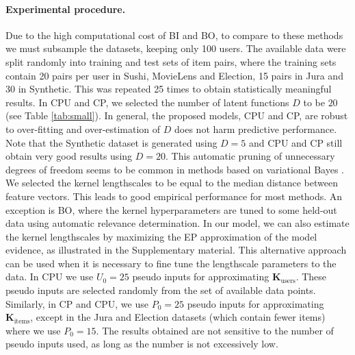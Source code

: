 \paragraph{Experimental procedure.} Due to the high computational cost of BI and BO, to compare to these methods we must subsample the datasets, keeping only 100 users.
The available data were split randomly into training and test sets of item pairs,
where the training sets contain 20 pairs per user in Sushi, MovieLens and Election, 15 pairs in Jura and
30 in Synthetic. This was repeated 25 times to obtain statistically meaningful results.
In CPU and CP, we selected the number of latent functions $D$ to be $20$ (see Table \ref{tab:small}).
In general, the proposed models, CPU and CP, are robust to over-fitting and over-estimation of
$D$ does not harm predictive performance. Note that the Synthetic dataset is generated
using $D=5$ and CPU and CP still obtain very good results using $D = 20$.
This automatic pruning of unnecessary degrees of freedom seems to be common
in methods based on variational Bayes \cite{MacKay2001}.
We selected the kernel lengthscales to be equal to
the median distance between feature vectors. This leads to good empirical performance
for most methods. An exception is BO, where the kernel hyperparameters
are tuned to some held-out data using automatic relevance determination.
In our model, we can also estimate the kernel
lengthscales by maximizing the EP approximation of the model evidence,
as illustrated in the Supplementary material. This alternative approach can be used
when it is necessary to fine tune the lengthscale parameters to the data. In CPU we use $U_0 = 25$ pseudo inputs for approximating $\mathbf{K}_\text{users}$.
These pseudo inputs are selected randomly from the set of available data points.
Similarly, in CP and CPU, we use $P_0 = 25$ pseudo inputs for approximating $\mathbf{K}_\text{items}$,
except in the Jura and Election datasets (which contain fewer items) where we use $P_0 = 15$.
The results obtained are not sensitive to the number of pseudo inputs used, as long as
the number is not excessively low.



